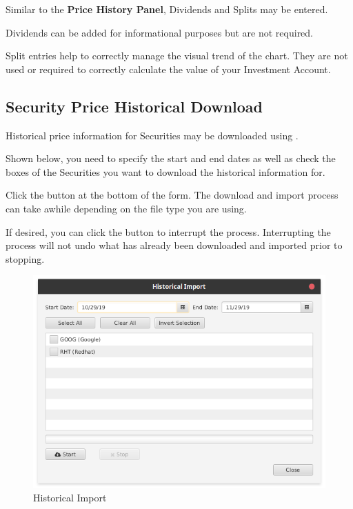 \documentclass[letterpaper,12pt]{book}
\begin{document}
    Similar to the \textbf{Price History Panel}, Dividends and Splits may be entered.
    
    Dividends can be added for informational purposes but are not required.
    
    Split entries help to correctly manage the visual trend of the chart.  They are not used or required
    to correctly calculate the value of your Investment Account.
    
    
        
           
    \subsection{Security Price Historical Download}
    
    Historical price information for Securities may be downloaded using .
    
    Shown below, you need to specify the start and end dates as well as check the boxes of the Securities you
    want to download the historical information for.
    
    Click the  button at the bottom of the form.  The download and import process can take awhile 
    depending on the file type you are using.  
    
    If desired, you can click the  button to interrupt the process.  Interrupting the process will not
    undo what has already been downloaded and imported prior to stopping.
    
    \begin{figure}[h]
        \caption{Historical Import}
        \includegraphics[width=1.0\linewidth]{images/securityHistoryImport}
    \end{figure}
          
\end{document}
